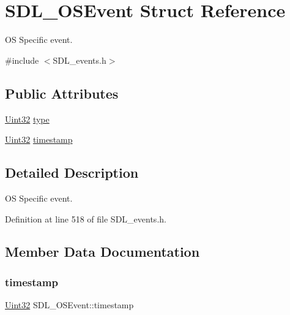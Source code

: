 \hypertarget{struct_s_d_l___o_s_event}{}\section{S\+D\+L\+\_\+\+O\+S\+Event Struct Reference}
\label{struct_s_d_l___o_s_event}


OS Specific event.  




{\ttfamily \#include $<$S\+D\+L\+\_\+events.\+h$>$}

\subsection*{Public Attributes}
\begin{DoxyCompactItemize}
\item 
\mbox{\hyperlink{_s_d_l__stdinc_8h_add440eff171ea5f55cb00c4a9ab8672d}{Uint32}} \mbox{\hyperlink{struct_s_d_l___o_s_event_a85a600619ebebc8db007fc757b3895a5}{type}}
\item 
\mbox{\hyperlink{_s_d_l__stdinc_8h_add440eff171ea5f55cb00c4a9ab8672d}{Uint32}} \mbox{\hyperlink{struct_s_d_l___o_s_event_a8b2480eefadad9f3f8c94f8e550b7fb0}{timestamp}}
\end{DoxyCompactItemize}


\subsection{Detailed Description}
OS Specific event. 

Definition at line 518 of file S\+D\+L\+\_\+events.\+h.



\subsection{Member Data Documentation}
\mbox{\label{struct_s_d_l___o_s_event_a8b2480eefadad9f3f8c94f8e550b7fb0}} 
\subsubsection{\texorpdfstring{timestamp}{timestamp}}
{\footnotesize\ttfamily \mbox{\hyperlink{_s_d_l__stdinc_8h_add440eff171ea5f55cb00c4a9ab8672d}{Uint32}} S\+D\+L\+\_\+\+O\+S\+Event\+::timestamp}

